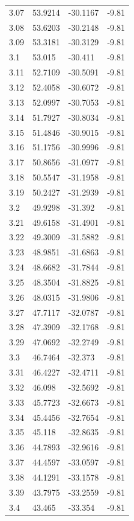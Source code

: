 \begin{tabular}{llll}
3.07 & 53.9214 & -30.1167 & -9.81 \\
3.08 & 53.6203 & -30.2148 & -9.81 \\
3.09 & 53.3181 & -30.3129 & -9.81 \\
3.1 & 53.015 & -30.411 & -9.81 \\
3.11 & 52.7109 & -30.5091 & -9.81 \\
3.12 & 52.4058 & -30.6072 & -9.81 \\
3.13 & 52.0997 & -30.7053 & -9.81 \\
3.14 & 51.7927 & -30.8034 & -9.81 \\
3.15 & 51.4846 & -30.9015 & -9.81 \\
3.16 & 51.1756 & -30.9996 & -9.81 \\
3.17 & 50.8656 & -31.0977 & -9.81 \\
3.18 & 50.5547 & -31.1958 & -9.81 \\
3.19 & 50.2427 & -31.2939 & -9.81 \\
3.2 & 49.9298 & -31.392 & -9.81 \\
3.21 & 49.6158 & -31.4901 & -9.81 \\
3.22 & 49.3009 & -31.5882 & -9.81 \\
3.23 & 48.9851 & -31.6863 & -9.81 \\
3.24 & 48.6682 & -31.7844 & -9.81 \\
3.25 & 48.3504 & -31.8825 & -9.81 \\
3.26 & 48.0315 & -31.9806 & -9.81 \\
3.27 & 47.7117 & -32.0787 & -9.81 \\
3.28 & 47.3909 & -32.1768 & -9.81 \\
3.29 & 47.0692 & -32.2749 & -9.81 \\
3.3 & 46.7464 & -32.373 & -9.81 \\
3.31 & 46.4227 & -32.4711 & -9.81 \\
3.32 & 46.098 & -32.5692 & -9.81 \\
3.33 & 45.7723 & -32.6673 & -9.81 \\
3.34 & 45.4456 & -32.7654 & -9.81 \\
3.35 & 45.118 & -32.8635 & -9.81 \\
3.36 & 44.7893 & -32.9616 & -9.81 \\
3.37 & 44.4597 & -33.0597 & -9.81 \\
3.38 & 44.1291 & -33.1578 & -9.81 \\
3.39 & 43.7975 & -33.2559 & -9.81 \\
3.4 & 43.465 & -33.354 & -9.81 \\

\end{tabular}
